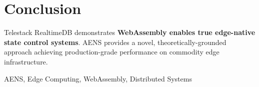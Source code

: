 \documentclass[conference]{IEEEtran}
\begin{document}
\section{Conclusion}
Telestack RealtimeDB demonstrates \textbf{WebAssembly enables true edge-native state control systems}. AENS provides a novel, theoretically-grounded approach achieving production-grade performance on commodity edge infrastructure.

\begin{IEEEkeywords}
AENS, Edge Computing, WebAssembly, Distributed Systems
\end{IEEEkeywords}



\end{document}
